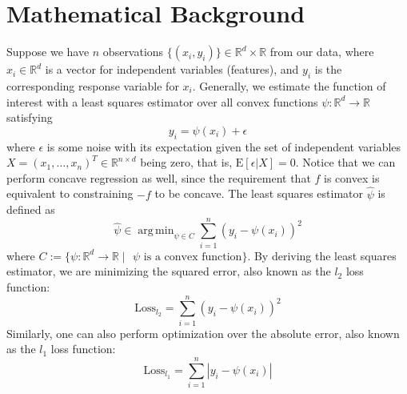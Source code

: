 \documentclass{article}
\newcommand{\E}{\mathrm{E}}
\DeclareMathOperator*{\argmin}{arg\,min}
\begin{document}
\section{Mathematical Background} \label{s2}
Suppose we have $n$ observations $\{(x_i,y_i)\} \in \mathbb{R}^d \times \mathbb{R}$ from our data, where $x_i \in \mathbb{R}^d$ is a vector for independent variables (features), and $y_i$ is the corresponding response variable for $x_i$. Generally, we estimate the function of interest with a least squares estimator over all convex functions $\psi: \mathbb{R}^d \rightarrow \mathbb{R}$ satisfying
\begin{equation} \label{lr1}
    y_i = \psi(x_i) + \epsilon
\end{equation}
where $\epsilon$ is some noise with its expectation given the set of independent variables $X=(x_1,\dots,x_n)^T \in \mathbb{R}^{n \times d}$ being zero, that is, $\E[\epsilon|X]=0$. Notice that we can perform concave regression as well, since the requirement that $f$ is convex is equivalent to constraining $-f$ to be concave.  The least squares estimator $\hat{\psi}$ is defined as
\begin{equation} \label{lr2}
    \hat{\psi} \in \argmin_{\psi \in C} \sum_{i=1}^n (y_i-\psi(x_i))^2
\end{equation}
where $C:=\{\psi:\mathbb{R}^d \rightarrow \mathbb{R} \;|\text{ $\psi$ is a convex function} \}$. By deriving the least squares estimator, we are minimizing the squared error, also known as the $l_2$ loss function:
\begin{equation} \label{loss}
    \text{Loss}_{l_2}=\sum_{i=1}^n (y_i-\psi(x_i))^2
\end{equation}
Similarly, one can also perform optimization over the absolute error, also known as the $l_1$ loss function:
\begin{equation} \label{loss}
    \text{Loss}_{l_1}=\sum_{i=1}^n |y_i-\psi(x_i)|
\end{equation}
\end{document}
